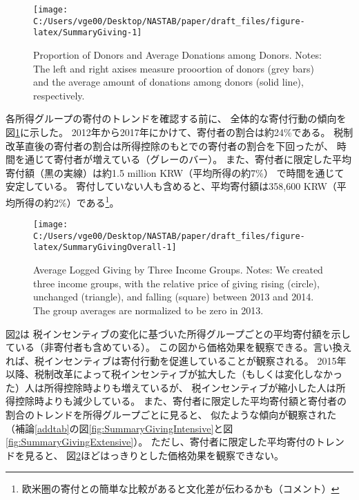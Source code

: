 \documentclass[
  11pt,
  a4paper,
]{article}
\begin{document}
\begin{figure}[t]

{\centering \texttt{[image: C:/Users/vge00/Desktop/NASTAB/paper/draft\_files/figure-latex/SummaryGiving-1]} 

}

\caption{Proportion of Donors and Average Donations among Donors. Notes: The left and right axises measure prooortion of donors (grey bars) and the average amount of donations among donors (solid line), respectively.}\label{fig:SummaryGiving}
\end{figure}

各所得グループの寄付のトレンドを確認する前に、
全体的な寄付行動の傾向を図\ref{fig:SummaryGiving}に示した。
2012年から2017年にかけて、寄付者の割合は約24\%である。
税制改革直後の寄付者の割合は所得控除のもとでの寄付者の割合を下回ったが、
時間を通じて寄付者が増えている（グレーのバー）。
また、寄付者に限定した平均寄付額（黒の実線）は約1.5 million KRW（平均所得の約7\%）
で時間を通じて安定している。
寄付していない人も含めると、平均寄付額は358,600 KRW（平均所得の約2\%）である\footnote{欧米圏の寄付との簡単な比較があると文化差が伝わるかも（コメント）}。

\begin{figure}[t]

{\centering \texttt{[image: C:/Users/vge00/Desktop/NASTAB/paper/draft\_files/figure-latex/SummaryGivingOverall-1]} 

}

\caption{Average Logged Giving by Three Income Groups. Notes: We created three income groups, with the relative price of giving rising (circle), unchanged (triangle), and falling (square) between 2013 and 2014. The group averages are normalized to be zero in 2013.}\label{fig:SummaryGivingOverall}
\end{figure}

図\ref{fig:SummaryGivingOverall}は
税インセンティブの変化に基づいた所得グループごとの平均寄付額を示している（非寄付者も含めている）。
この図から価格効果を観察できる。言い換えれば、税インセンティブは寄付行動を促進していることが観察される。
2015年以降、税制改革によって税インセンティブが拡大した（もしくは変化しなかった）人は所得控除時よりも増えているが、
税インセンティブが縮小した人は所得控除時よりも減少している。
また、寄付者に限定した平均寄付額と寄付者の割合のトレンドを所得グループごとに見ると、
似たような傾向が観察された
（補論\ref{addtab}の図\ref{fig:SummaryGivingIntensive}と図\ref{fig:SummaryGivingExtensive}）。
ただし、寄付者に限定した平均寄付のトレンドを見ると、
図\ref{fig:SummaryGivingOverall}ほどはっきりとした価格効果を観察できない。
\end{document}
